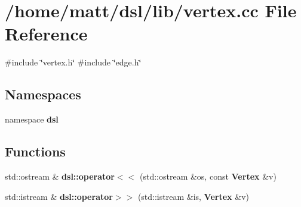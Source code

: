 \section{/home/matt/dsl/lib/vertex.cc \-File \-Reference}
\label{vertex_8cc}
{\ttfamily \#include \char`\"{}vertex.\-h\char`\"{}}\*
{\ttfamily \#include \char`\"{}edge.\-h\char`\"{}}\*
\subsection*{\-Namespaces}
\begin{DoxyCompactItemize}
\item 
namespace {\bf dsl}
\end{DoxyCompactItemize}
\subsection*{\-Functions}
\begin{DoxyCompactItemize}
\item 
std\-::ostream \& {\bf dsl\-::operator$<$$<$} (std\-::ostream \&os, const {\bf \-Vertex} \&v)
\item 
std\-::istream \& {\bf dsl\-::operator$>$$>$} (std\-::istream \&is, {\bf \-Vertex} \&v)
\end{DoxyCompactItemize}
